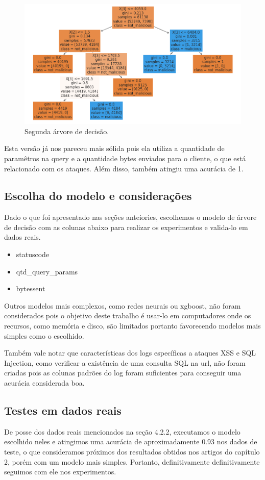 \begin{figure}
    \centering
    \includegraphics[width=.9\textwidth]{figuras/segunda_arvore.png}
    \caption{Segunda árvore de decisão. \label{fig:segunda_arvore}}    
\end{figure}

Esta versão já nos pareceu mais sólida pois ela utiliza a quantidade de paramêtros na query 
e a quantidade bytes enviados para o cliente, o que está relacionado com os ataques. Além disso,
também atingiu uma acurácia de 1.

\subsection{Escolha do modelo e considerações}

Dado o que foi apresentado nas seções anteiories, escolhemos o modelo de árvore de decisão com as colunas
abaixo para realizar os experimentos e valida-lo em dados reais. 

\begin{itemize}
    \item statuscode
    \item qtd\_query\_params
    \item bytessent
\end{itemize}

Outros modelos mais complexos, como redes neurais ou xgboost, não foram considerados pois o 
objetivo deste trabalho é usar-lo em computadores onde os recursos, como memória e disco, são
limitados portanto favorecendo modelos mais simples como o escolhido.

Também vale notar que características dos logs específicas a ataques XSS e SQL Injection, como 
verificar a existência de uma consulta SQL na url, não foram criadas pois as colunas padrões 
do log foram suficientes para conseguir uma acurácia considerada boa.

\subsection{Testes em dados reais}

De posse dos dados reais mencionados na seção 4.2.2, executamos o modelo escolhido neles e atingimos 
uma acurácia de aproximadamente 0.93 nos dados de teste, o que consideramos próximos dos resultados 
obtidos nos artigos do capítulo 2, porém com um modelo mais simples. Portanto, definitivamente definitivamente
seguimos com ele nos experimentos.
